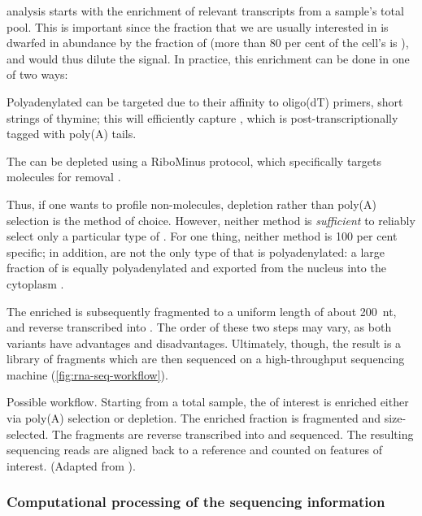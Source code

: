 \rnaseq analysis starts with the enrichment of relevant transcripts from a
sample’s total \rna pool. This is important since the \rna fraction that we are
usually interested in is dwarfed in abundance by the fraction of \rrna (more
than \num{80} per cent of the cell’s \rna is \rrna\todo[ref]{}), and would thus
dilute the signal. In practice, this enrichment can be done in one of two ways:
\begin{enumerate*}
    \item Polyadenylated \rna can be targeted due to their affinity to oligo(dT)
        primers, short strings of thymine; this will efficiently capture \mrna,
        which is post-transcriptionally \threep tagged with poly(A)
        tails.\todo[ref]{}
    \item The \rna can be \rrna depleted using a RiboMinus protocol, which
        specifically targets \rrna molecules for removal \citep{Cui:2010}.
\end{enumerate*}
Thus, if one wants to profile non-\mrna molecules, \rrna depletion rather than
poly(A) selection is the method of choice. However, neither method is
\emph{sufficient} to reliably select only a particular type of \rna. For one
thing, neither method is \num{100} per cent specific; in addition, \mrna[s] are
not the only type of \rna that is polyadenylated: a large fraction of \ncrna is
equally polyadenylated and exported from the nucleus into the cytoplasm
\citep{Cheng:2005}.

The enriched \rna is subsequently fragmented to a uniform length of about
\SI{200}{nt}, and reverse transcribed into \cdna. The order of these two steps
may vary, as both variants have advantages and disadvantages. Ultimately,
though, the result is a \cdna library of fragments which are then sequenced on a
high-throughput sequencing machine (\cref{fig:rna-seq-workflow}).

    {Possible \rnaseq workflow.}
    {Starting from a total \rna sample, the \rna of interest is enriched either
    via poly(A) selection or \rrna depletion. The enriched fraction is
    fragmented and size-selected. The fragments are reverse transcribed into
    \cdna and sequenced. The resulting sequencing reads are aligned back to a
    reference and counted on features of interest. (Adapted from
    \citet{Mortazavi:2008}).}

\subsubsection{Computational processing of the sequencing information}

